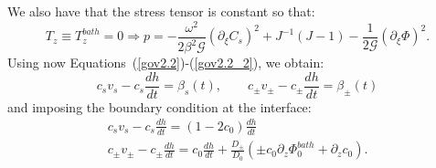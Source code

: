 \documentclass[12pt]{extarticle}
\begin{document}
We also have that the stress tensor is constant so that:
\begin{equation}
T_z\equiv T^{bath}_z=0 \Rightarrow p =-\frac{\omega^2 }{2\beta^2\mathcal{G}} (\partial_\xi C_s)^2+ J^{-1}\left(J-1\right)-\frac{1}{2\mathcal{G}} (\partial_\xi \Phi)^2.
\end{equation}
Using now Equations~(\ref{gov2.2})-(\ref{gov2.2_2}), we obtain:
\begin{equation}
c_s v_s - c_s \frac{dh}{dt}=\beta_s(t), \qquad c_\pm v_\pm - c_\pm \frac{dh}{dt}=\beta_\pm(t)
\end{equation}
and imposing the boundary condition at the interface:
\begin{gather}
c_s v_s - c_s \frac{dh}{dt}=(1-2c_0)\frac{dh}{dt}\\
c_\pm v_\pm - c_\pm \frac{dh}{dt}=c_0 \frac{dh}{dt}  +\frac{D_\pm}{D_0}\left(\pm c_0 \partial_z \Phi^{bath}_0+\partial_z c_0\right).
\end{gather}
\end{document}

